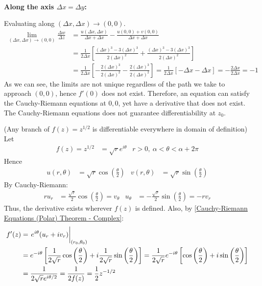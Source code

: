 \documentclass[12pt, english]{book}
\begin{document}
\begin{example}
{			\textbf{Along the axis \(\Delta x = \Delta y\):}
			
			Evaluating along \((\Delta x, \Delta x) \rightarrow (0,0)\).
			\begin{align*}
				\lim_{(\Delta x,\Delta x) \rightarrow (0,0)} \frac{\Delta w}{\Delta z}
					&= \frac{u(\Delta x, \Delta x)}{\Delta x + \Delta x} - \frac{u(0,0) + v(0,0)}{\Delta x + \Delta x} \\
					&= \frac{1}{2\Delta x} \left[ \frac{(\Delta x)^3 - 3(\Delta x)^3}{2(\Delta x)^2} + \frac{(\Delta x)^3 - 3(\Delta x)^3}{2(\Delta x)^2}\right] \\
					&= \frac{1}{2\Delta x}  \left[ - \frac{2(\Delta x)^3}{2(\Delta x)^2} - \frac{2(\Delta x)^3}{2(\Delta x)^2} \right] 
					= \frac{1}{2\Delta x} \left[-\Delta x - \Delta x \right] = -\frac{2\Delta x}{2\Delta x} = -1
			\end{align*}
			As we can see, the limits are not unique regardless of the path we take to approach \((0,0)\), hence \(f'(0)\) does not exist. Therefore, an equation can satisfy the Cauchy-Riemann equations at \(0,0\), yet have a derivative that does not exist. The Cauchy-Riemann equations does not guarantee differentiability at \(z_0\).
		}
		
	
	\end{example}

	\begin{example}(Any branch of \(f(z) = z^{1/2}\) is differentiable everywhere in domain of definition)
		Let 
		\begin{align*}
			f(z) = z^{1/2} &= \sqrt{r}e^{i\theta}	&	r>0, \ \alpha<\theta<\alpha+2\pi
		\end{align*}
		Hence
		\begin{align*}
			u(r, \theta) &= \sqrt{r}\cos \left(\frac{\theta}{2}\right) &
			v(r, \theta) &= \sqrt{r}\sin \left(\frac{\theta}{2}\right)
		\end{align*}
		By Cauchy-Riemann: 
		\begin{align*}
			ru_r &= \frac{\sqrt{r}}{2} \cos \left(\frac{\theta}{2}\right) = v_\theta &
			u_\theta &= - \frac{\sqrt{r}}{2} \sin \left(\frac{\theta}{2}\right) = -r v_r
		\end{align*}
		Thus, the derivative exists wherever \(f(z)\) is defined. Also, by \cref{Cauchy-Riemann Equations (Polar) Theorem - Complex}:
		\begin{align*}
			f'(z) 
				&= \eval{e^{i\theta} (u_r + iv_r)}_{(r_0, \theta_0)} \\
				&= e^{-i\theta} \left[\frac{1}{2\sqrt{r}}\cos\left(\frac{\theta}{2}\right) + i \frac{1}{2\sqrt{r}}\sin\left(\frac{\theta}{2}\right)\right] 
				= \frac{1}{2\sqrt{r}} e^{-i\theta} \left[\cos \left(\frac{\theta}{2}\right) + i \sin \left(\frac{\theta}{2}\right)\right] \\
				&= \frac{1}{2\sqrt{r}e^{i\theta/2}} = \frac{1}{2f(z)} = \frac{1}{2} z^{-1/2}
		\end{align*}
	\end{example}
\end{document}
